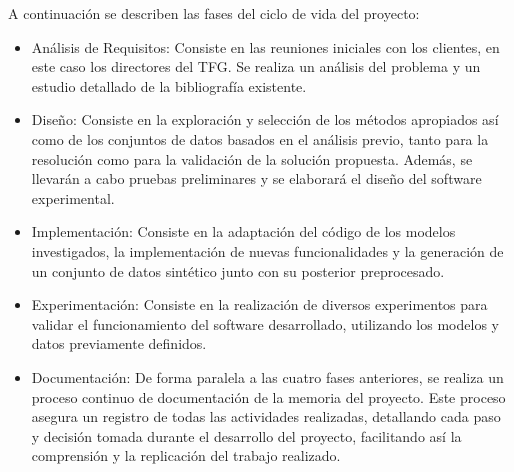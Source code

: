 A continuación se describen las fases del ciclo de vida del proyecto:
\begin{itemize}
	\item Análisis de Requisitos: Consiste en las reuniones iniciales con los clientes, en este caso los directores del TFG. Se realiza un análisis del problema y un estudio detallado de la bibliografía existente.
	\item Diseño: Consiste en la exploración y selección de los métodos apropiados así como de los conjuntos de datos basados en el análisis previo, tanto para la resolución como para la validación de la solución propuesta. Además, se llevarán a cabo pruebas preliminares y se elaborará el diseño del software experimental.
	\item Implementación: Consiste en la adaptación del código de los modelos investigados, la implementación de nuevas funcionalidades y la generación de un conjunto de datos sintético junto con su posterior preprocesado.
	\item Experimentación: Consiste en la realización de diversos experimentos para validar el funcionamiento del software desarrollado, utilizando los modelos y datos previamente definidos.
	\item Documentación: De forma paralela a las cuatro fases anteriores, se realiza un proceso continuo de documentación de la memoria del proyecto. Este proceso asegura un registro de todas las actividades realizadas, detallando cada paso y decisión tomada durante el desarrollo del proyecto, facilitando así la comprensión y la replicación del trabajo realizado.
\end{itemize}

